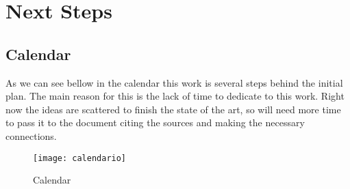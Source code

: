 
%

\chapter{Next Steps}
\label{cha:next_steps}

\section{Calendar}
\label{sec:Calendar}

As we can see bellow in the calendar this work is several steps behind the initial plan. The main reason for this is the lack of time to dedicate to this work.
 Right now the ideas are scattered to finish the state of the art, so will need more time to pass it to the document citing the sources and making the necessary connections.


\begin{figure}[htbp]
    \centering
    \texttt{[image: calendario]}%
    \caption{Calendar}
    \label{fig:calendar}
\end{figure}

